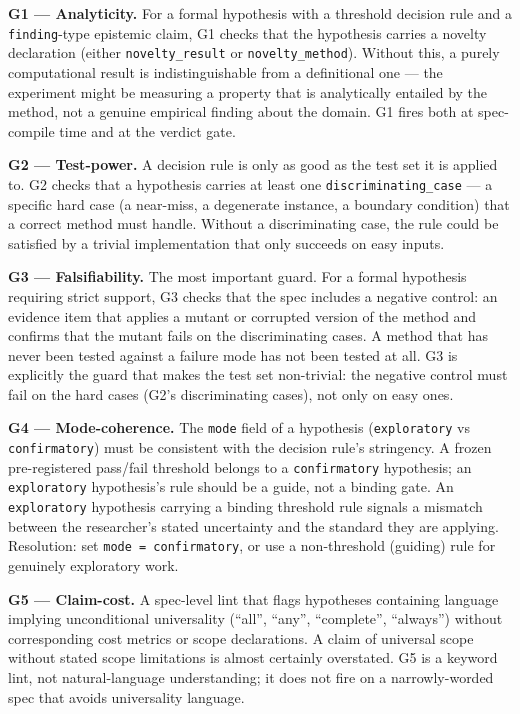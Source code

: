 \documentclass[11pt]{article}
\begin{document}
\textbf{G1 --- Analyticity.} For a formal hypothesis with a threshold decision rule and a \texttt{finding}-type epistemic claim, G1 checks that the hypothesis carries a novelty declaration (either \texttt{novelty\_result} or \texttt{novelty\_method}). Without this, a purely computational result is indistinguishable from a definitional one --- the experiment might be measuring a property that is analytically entailed by the method, not a genuine empirical finding about the domain. G1 fires both at spec-compile time and at the verdict gate.

\textbf{G2 --- Test-power.} A decision rule is only as good as the test set it is applied to. G2 checks that a hypothesis carries at least one \texttt{discriminating\_case} --- a specific hard case (a near-miss, a degenerate instance, a boundary condition) that a correct method must handle. Without a discriminating case, the rule could be satisfied by a trivial implementation that only succeeds on easy inputs.

\textbf{G3 --- Falsifiability.} The most important guard. For a formal hypothesis requiring strict support, G3 checks that the spec includes a negative control: an evidence item that applies a mutant or corrupted version of the method and confirms that the mutant fails on the discriminating cases. A method that has never been tested against a failure mode has not been tested at all. G3 is explicitly the guard that makes the test set non-trivial: the negative control must fail on the hard cases (G2's discriminating cases), not only on easy ones.

\textbf{G4 --- Mode-coherence.} The \texttt{mode} field of a hypothesis (\texttt{exploratory} vs \texttt{confirmatory}) must be consistent with the decision rule's stringency. A frozen pre-registered pass/fail threshold belongs to a \texttt{confirmatory} hypothesis; an \texttt{exploratory} hypothesis's rule should be a guide, not a binding gate. An \texttt{exploratory} hypothesis carrying a binding threshold rule signals a mismatch between the researcher's stated uncertainty and the standard they are applying. Resolution: set \texttt{mode = confirmatory}, or use a non-threshold (guiding) rule for genuinely exploratory work.

\textbf{G5 --- Claim-cost.} A spec-level lint that flags hypotheses containing language implying unconditional universality (``all'', ``any'', ``complete'', ``always'') without corresponding cost metrics or scope declarations. A claim of universal scope without stated scope limitations is almost certainly overstated. G5 is a keyword lint, not natural-language understanding; it does not fire on a narrowly-worded spec that avoids universality language.
\end{document}
